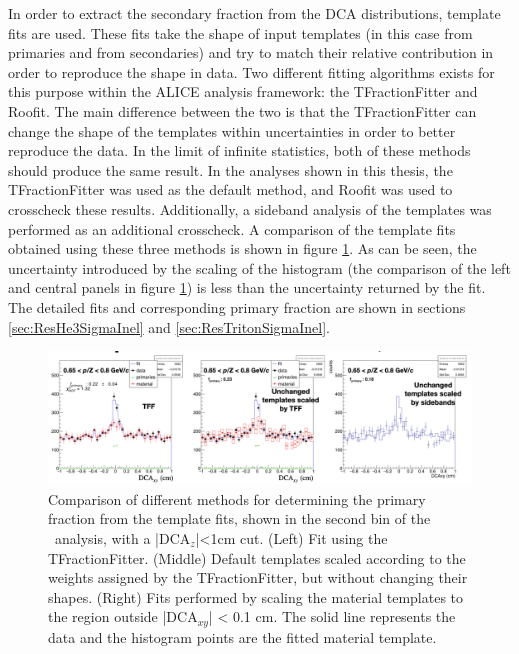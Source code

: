 In order to extract the secondary fraction from the DCA distributions, template fits are used. These fits take the shape of input templates (in this case from primaries and from secondaries) and try to match their relative contribution in order to reproduce the shape in data. Two different fitting algorithms exists for this purpose within the ALICE analysis framework: the TFractionFitter and Roofit. The main difference between the two is that the TFractionFitter can change the shape of the templates within uncertainties in order to better reproduce the data. In the limit of infinite statistics, both of these methods should produce the same result. In the analyses shown in this thesis, the TFractionFitter was used as the default method, and Roofit was used to crosscheck these results. Additionally, a sideband analysis of the templates was performed as an additional crosscheck. A comparison of the template fits obtained using these three methods is shown in figure \ref{fig:Template_Fit_methods_comparison}. As can be seen, the uncertainty introduced by the scaling of the histogram (the comparison of the left and central panels in figure \ref{fig:Template_Fit_methods_comparison}) is less than the uncertainty returned by the fit. The detailed fits and corresponding primary fraction are shown in sections \ref{sec:ResHe3SigmaInel} and \ref{sec:ResTritonSigmaInel}.\\   

\begin{figure}
    \centering
    \includegraphics[width=\textwidth]{figures/comparison_template_fitting_techniques.png}
    \caption{Comparison of different methods for determining the primary fraction from the template fits, shown in the second bin of the \ahe\ analysis, with a |DCA$_z$|<1cm cut. (Left) Fit using the TFractionFitter. (Middle) Default templates scaled according to the weights assigned by the TFractionFitter, but without changing their shapes. (Right) Fits performed by scaling the material templates to the region outside |DCA$_{xy}$| < 0.1 cm. The solid line represents the data and the histogram points are the fitted material template.}
    \label{fig:Template_Fit_methods_comparison}
\end{figure}

